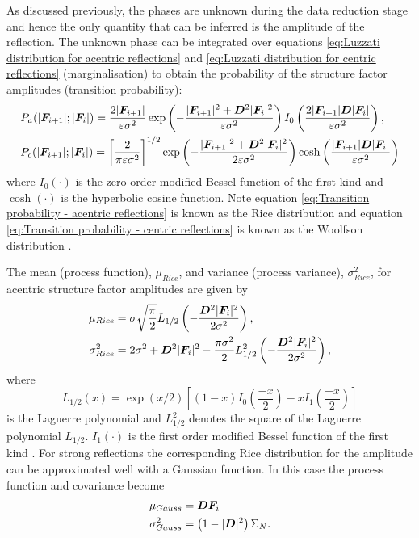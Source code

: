 As discussed previously, the phases are unknown during the data reduction stage and hence the only quantity that can be inferred is the amplitude of the reflection.
The unknown phase can be integrated over equations \ref{eq:Luzzati distribution for acentric reflections} and \ref{eq:Luzzati distribution for centric reflections} (marginalisation) to obtain the probability of the structure factor amplitudes (transition probability):
\begin{align}
    &P_a(|\boldsymbol{F}_{i+1}| ; |\boldsymbol{F}_i|) = \frac{2|\boldsymbol{F}_{i+1}|}{\varepsilon \sigma^2} \exp \left(-\frac{|\boldsymbol{F}_{i+1}|^2 + \boldsymbol{D}^2|\boldsymbol{F}_{i}|^2}{\varepsilon \sigma^2}\right)I_0 \left(\frac{2|\boldsymbol{F}_{i+1}|\boldsymbol{D}|\boldsymbol{F}_{i}|}{\varepsilon \sigma^2}\right), \label{eq:Transition probability - acentric reflections} \\
    &P_c(|\boldsymbol{F}_{i+1}| ; |\boldsymbol{F}_i|) = \left[\frac{2}{\pi \varepsilon \sigma^2}\right]^{1/2} \exp \left(-\frac{|\boldsymbol{F}_{i+1}|^2 + \boldsymbol{D}^2|\boldsymbol{F}_{i}|^2}{2\varepsilon \sigma^2}\right) \cosh \left(\frac{|\boldsymbol{F}_{i+1}|\boldsymbol{D}|\boldsymbol{F}_{i}|}{\varepsilon \sigma^2}\right) \label{eq:Transition probability - centric reflections}
\end{align}
where $I_0(\cdot)$ is the zero order modified Bessel function of the first kind and $\cosh(\cdot)$ is the hyperbolic cosine function.
Note equation \ref{eq:Transition probability - acentric reflections} is known as the Rice distribution and equation \ref{eq:Transition probability - centric reflections} is known as the Woolfson distribution \cite{mccoy2004liking}.

The mean (process function), $\mu_{Rice}$, and variance (process variance), $\sigma_{Rice}^2$, for acentric structure factor amplitudes are given by
\begin{align}
    \mu_{Rice} &= \sigma \sqrt{\frac{\pi}{2}} L_{1/2} \left(-\frac{\boldsymbol{D}^2|\boldsymbol{F}_i|^2}{2\sigma^2}\right), \label{eq:Process function - mean of rice distribution}\\
    \sigma_{Rice}^2 &= 2\sigma^2 + \boldsymbol{D}^2|\boldsymbol{F}_i|^2 - \frac{\pi \sigma^2}{2} L_{1/2}^2 \left(-\frac{\boldsymbol{D}^2|\boldsymbol{F}_i|^2}{2\sigma^2}\right), \label{eq:Process covariance - variance of rice distribution}
\end{align}
where
\begin{equation}
    L_{1/2}(x) = \exp \left( x/2 \right) \left[ (1-x) I_0 \left( \frac{-x}{2} \right) - xI_1 \left( \frac{-x}{2} \right) \right] \label{eq:Laguerre polynomial}
\end{equation}
is the Laguerre polynomial and $ L_{1/2}^2 $ denotes the square of the Laguerre polynomial $ L_{1/2} $. $I_1(\cdot)$ is the first order modified Bessel function of the first kind \cite{den2014data}.
For strong reflections the corresponding Rice distribution for the amplitude can be approximated well with a Gaussian function.
In this case the process function and covariance become
\begin{align}
    \mu_{Gauss} &= \boldsymbol{D}\boldsymbol{F}_i \label{eq:Process function - mean of Gaussian distribution}\\
    \sigma_{Gauss}^2 &= \left(1 - |\boldsymbol{D}|^2 \right)\Sigma_N. \label{eq:Process covariance - variance of Gaussian distribution}
\end{align}

